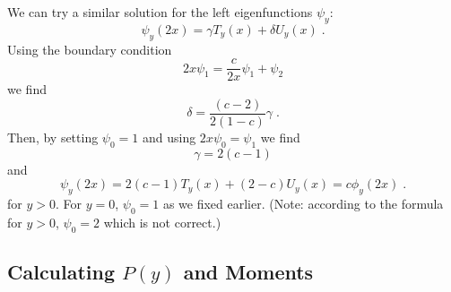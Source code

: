 \documentclass[a4paper,10pt]{article}
\begin{document}
We can try a similar solution for the left eigenfunctions $\psi_y$:
\begin{equation}
  \psi_y(2x) = \gamma T_y(x) + \delta U_y(x) \;.
\end{equation}
Using the boundary condition 
\begin{equation}
  2x\psi_1 = \frac{c}{2x} \psi_1 + \psi_2
\end{equation}
we find
\begin{equation}
  \delta = \frac{(c-2)}{2(1-c)} \gamma \;.
\end{equation}
Then, by setting $\psi_0 = 1$ and using $2x\psi_0 = \psi_1$ we find
\begin{equation}
  \gamma = 2(c-1)
\end{equation}
and
\begin{equation}
  \psi_y(2x) = 2(c-1) T_y(x) + (2-c) U_y(x) = c\phi_y(2x) \;.
\end{equation}
for $y>0$. For $y=0$, $\psi_0 = 1$ as we fixed earlier. (Note: according to the formula for $y>0$, $\psi_0 = 2 $ which is not correct.)

\subsection{Calculating $P(y)$ and Moments}
\end{document}
